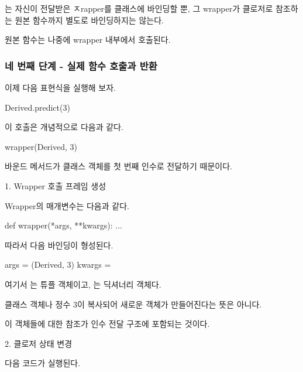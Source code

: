 는 자신이 전달받은 ㅈrapper를 클래스에 바인딩할 뿐, 그 wrapper가 클로저로 참조하는 원본 함수까지 별도로 바인딩하지는 않는다.

원본 함수는 나중에 wrapper 내부에서 호출된다.

\subsubsection{네 번째 단계 - 실제 함수 호출과 반환}

이제 다음 표현식을 실행해 보자.

\begin{dhkcode}
Derived.predict(3)
\end{dhkcode}

이 호출은 개념적으로 다음과 같다.

\begin{dhkcode}
wrapper(Derived, 3)
\end{dhkcode}

바운드 메서드가  클래스 객체를 첫 번째 인수로 전달하기 때문이다.

\begin{dhknote}
\begin{dhksmry}[centered]
1. Wrapper 호출 프레임 생성
\end{dhksmry}
\end{dhknote}

Wrapper의 매개변수는 다음과 같다.

\begin{dhkcode}
def wrapper(*args, **kwargs):
    ...
\end{dhkcode}

따라서 다음 바인딩이 형성된다.

\begin{dhkzsh}
args = (Derived, 3)
kwargs = {}
\end{dhkzsh}

여기서 는 튜플 객체이고, 는 딕셔너리 객체다.

 클래스 객체나 정수 3이 복사되어 새로운 객체가 만들어진다는 뜻은 아니다.

이 객체들에 대한 참조가 인수 전달 구조에 포함되는 것이다.

\begin{dhknote}
\begin{dhksmry}[centered]
2. 클로저 상태 변경
\end{dhksmry}
\end{dhknote}

다음 코드가 실행된다.

